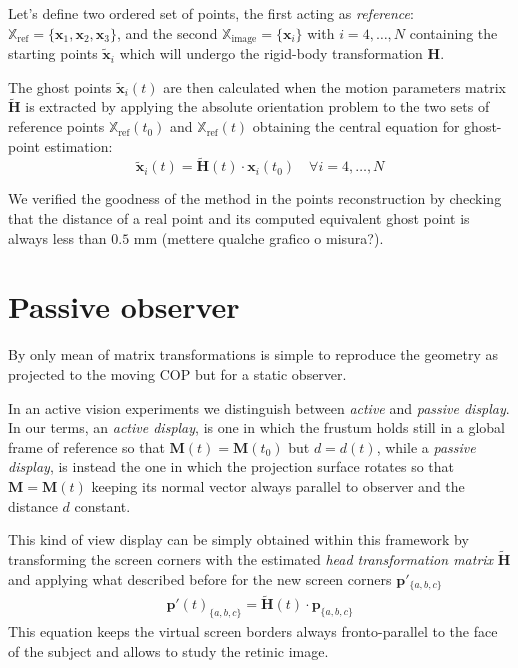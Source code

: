 \documentclass[acmtocl,acmnow]{acmtrans2m}
\begin{document}
Let's define two ordered set of points, the first acting as
\emph{reference}: $\mathbb{X}_{\textrm{ref}} = \{
\mathbf{x}_1,\mathbf{x}_2,\mathbf{x}_3 \}$,
and the second $\mathbb{X}_{\textrm{image}} =\{ \mathbf{x}_i \}$ with $i=4,\ldots,N$
containing the starting points $\mathbf{\tilde{x}}_{i}$  which will
undergo the rigid-body transformation $\mathbf{H}$.

The ghost points  $\tilde{\mathbf{x}}_i(t)$ are then calculated when the motion parameters matrix
$\tilde{\mathbf{H}}$ is extracted by applying the absolute orientation problem to the
two sets of reference points $\mathbb{X}_{\textrm{ref}}(t_0)$ and $\mathbb{X}_{\textrm{ref}}(t)$ obtaining the central equation for ghost-point estimation:
\begin{equation}
	\tilde{\mathbf{x}}_i(t) = \tilde{\mathbf{H}}(t)\cdot \mathbf{x}_i(t_0) \quad
\forall i=4,\ldots,N
\end{equation}

We verified the goodness of the method in the points reconstruction by checking that the distance of a real point and its computed equivalent ghost point is always less than $0.5$ mm (mettere qualche grafico o misura?).

\section{Passive observer}
By only mean of matrix transformations is simple to reproduce the geometry as projected to the moving COP but for a static observer.

In an active vision experiments we distinguish between \emph{active} and \emph{passive display}. In our terms, an \emph{active display}, is one in which the frustum holds 
still in a global frame of reference so that $\mathbf{M}(t) = \mathbf{M}(t_0)$ but $d=d(t)$, while a \emph{passive display}, is instead the one in which the projection 
surface rotates so that $\mathbf{M}=\mathbf{M}(t)$ keeping its normal vector always parallel to observer and the distance $d$ constant.

This kind of view display can be simply obtained within this framework by
transforming the screen corners with the estimated \emph{head transformation matrix}
$\tilde{\mathbf{H}}$ and applying what described before for the new screen corners
$\mathbf{p}'_{\{a,b,c \}}$
\begin{eqnarray}
\mathbf{{p}'}(t)_{\{a,b,c\}} = \tilde{\mathbf{H}}(t) \cdot \mathbf{p}_{\{a,b,c\}}
\end{eqnarray}
This equation keeps the virtual screen borders always fronto-parallel to the face of the subject and allows to study the retinic image.
\end{document}
